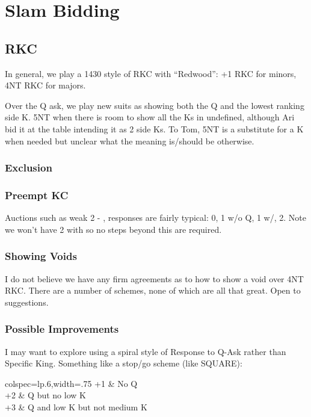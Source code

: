 \documentclass[main]{subfile}
\begin{document}
\chapter{Slam Bidding}

\section{RKC}

In general, we play a 1430 style of RKC with ``Redwood'':  +1 RKC for minors, 4NT RKC for majors.

Over the Q ask, we play new suits as showing both the Q and the lowest ranking side K.  5NT when there is room to show all the Ks in undefined, although Ari bid it at the table intending it as 2 side Ks.  To Tom, 5NT is a substitute for a K when needed but unclear what the meaning is/should be otherwise.

\subsection{Exclusion}

\subsection{Preempt KC}

Auctions such as weak 2 - , responses are fairly typical:  0, 1 w/o Q, 1 w/, 2.  Note we won't have 2 with so no steps beyond this are required.

\subsection{Showing Voids}

I do not believe we have any firm agreements as to how to show a void over 4NT RKC.  There are a number of schemes, none of which are all that great.  Open to suggestions.

\subsection{Possible Improvements}

I may want to explore using a spiral style of Response to Q-Ask rather than Specific King.  Something like a stop/go scheme (like SQUARE):

\begin{longtblr}[entry=none,label=none]{colspec=lp{.6\textwidth},width=.75\textwidth}
	+1 & No Q \\
	+2 & Q but no low K \\
	+3 & Q and low K but not medium K \\
\end{longtblr}
\end{document}
